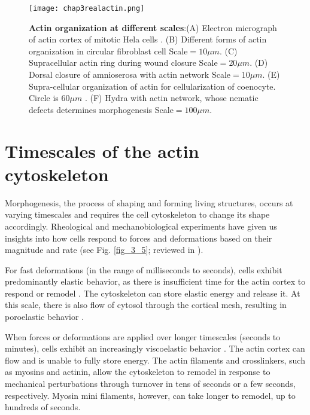 \begin{figure}
	\centering
	\texttt{[image: chap3realactin.png]}
	\caption{\label{fig_3_3} \textbf{Actin organization at different scales}:(A) Electron micrograph of actin cortex of mitotic Hela cells \cite{kelkar2020}. (B) Different forms of actin organization in circular fibroblast cell \cite{jalal2019} Scale$= 10\mu m$. (C) Supracellular actin ring during wound closure \cite{brugues2014} Scale$=20 \mu m$. (D) Dorsal closure of amnioserosa with actin network \cite{ducuing2016} Scale$= 10 \mu m$. (E) Supra-cellular organization of actin for cellularization of coenocyte. Circle is $60 \mu m$ \cite{dudin2019}. (F) Hydra with actin network, whose nematic defects determines morphogenesis \cite{maroudas-sacks2021} Scale$= 100 \mu m$.
	}
\end{figure}

\hypertarget{timescales-of-the-actin-cytoskeleton}{%
	\section{Timescales of the actin
		cytoskeleton}\label{timescales-of-the-actin-cytoskeleton}}

Morphogenesis, the process of shaping and forming living structures, occurs at varying timescales and requires the cell cytoskeleton to change its shape accordingly. Rheological and mechanobiological experiments have given us insights into how cells respond to forces and deformations based on their magnitude and rate (see Fig. \ref{fig_3_5}; reviewed in \cite{wyatt2016}).

For fast deformations (in the range of milliseconds to seconds), cells exhibit predominantly elastic behavior, as there is insufficient time for the actin cortex to respond or remodel \cite{deng2006}. The cytoskeleton can store elastic energy and release it. At this scale, there is also flow of cytosol through the cortical mesh, resulting in poroelastic behavior \cite{moeendarbary2013}.

When forces or deformations are applied over longer timescales (seconds to minutes), cells exhibit an increasingly viscoelastic behavior \cite{kollmannsberger2011}. The actin cortex can flow and is unable to fully store energy. The actin filaments and crosslinkers, such as myosins and actinin, allow the cytoskeleton to remodel in response to mechanical perturbations through turnover in tens of seconds or a few seconds, respectively. Myosin mini filaments, however, can take longer to remodel, up to hundreds of seconds.

